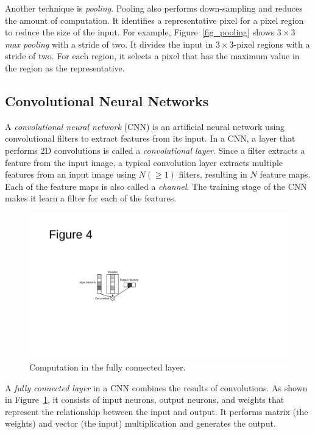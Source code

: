 Another technique is \textit{pooling}. Pooling also performs down-sampling and reduces the amount of computation. It identifies a representative pixel for a pixel region to reduce the size of the input. For example, Figure~\ref{fig_pooling} shows $3 \times 3$ \textit{max pooling} with a stride of two. It divides the input in $3 \times 3$-pixel regions with a stride of two. For each region, it selects a pixel that has the maximum value in the region as the representative. 

\subsection{Convolutional Neural Networks}
\label{sec:CNN}
A \textit{convolutional neural network} (CNN) is an artificial neural network using convolutional filters to extract features from its input. In a CNN, a layer that performs 2D convolutions is called a \textit{convolutional layer}. Since a filter extracts a feature from the input image, a typical convolution layer extracts multiple features from an input image using $N (\geq 1)$ filters, resulting in $N$ feature maps. Each of the feature maps is also called a \textit{channel}. The training stage of the CNN makes it learn a filter for each of the features.

\begin{figure}[htbp]
  \centering
  \includegraphics[width=0.5\linewidth]{./figures/fully}
  \caption{Computation in the fully connected layer. }
  \label{fig_fully}
\end{figure}

A \textit{fully connected layer} in a CNN combines the results of convolutions. As shown in Figure~\ref{fig_fully}, it consists of input neurons, output neurons, and weights that represent the relationship between the input and output. It performs matrix (the weights) and vector (the input) multiplication and generates the output.


